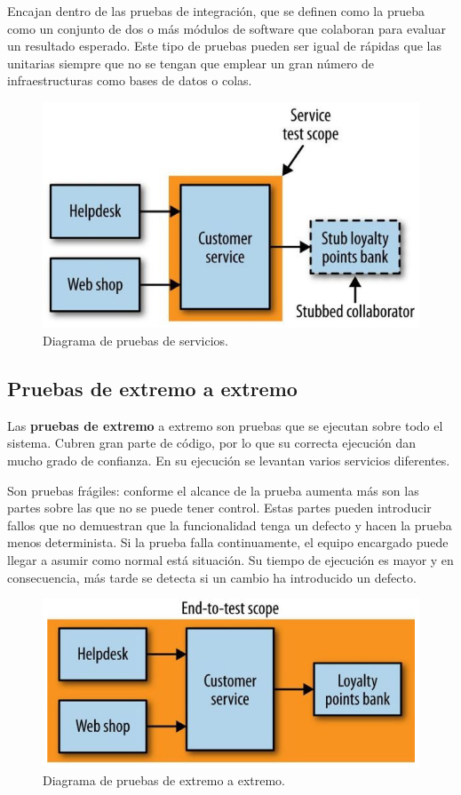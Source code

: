 \documentclass[11pt,spanish,listoffigures]{tfgetsinf}
\begin{document}
Encajan dentro de las pruebas de integración, que se definen como la prueba como un conjunto de dos o más módulos de software que colaboran para evaluar un resultado esperado. \cite{Osherove2014} Este tipo de pruebas pueden ser igual de rápidas que las unitarias siempre que no se tengan que emplear un gran número de infraestructuras como bases de datos o colas.

\begin{figure}[h]
\centering
\includegraphics[scale=0.5]{Service_Tests}
\caption{Diagrama de pruebas de servicios.}
\end{figure}

\subsection{Pruebas de extremo a extremo}

Las \textbf{pruebas de extremo} a extremo son pruebas que se ejecutan sobre todo el sistema. Cubren gran parte de código, por lo que su correcta ejecución dan mucho grado de confianza. En su ejecución se levantan varios servicios diferentes.

Son pruebas frágiles: conforme el alcance de la prueba aumenta más son las partes sobre las que no se puede tener control. Estas partes pueden introducir fallos que no demuestran que la funcionalidad tenga un defecto y hacen la prueba menos determinista. Si la prueba falla continuamente, el equipo encargado puede llegar a asumir como normal está situación. Su tiempo de ejecución es mayor y en consecuencia, más tarde se detecta si un cambio ha introducido un defecto. \cite{Newman2015a}

\begin{figure}[h]
\centering
\includegraphics[scale=0.5]{End_To_End_Test}
\caption{Diagrama de pruebas de extremo a extremo.}
\end{figure}
\end{document}
